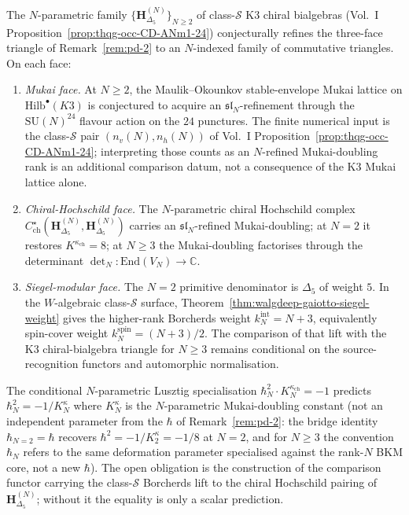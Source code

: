 \begin{remark}
\label{rem:pd-5-N-parametric}
The $N$-parametric family
$\{\mathbf H^{(N)}_{\Delta_5}\}_{N\ge 2}$ of class-$\mathcal S$
K3 chiral bialgebras
(Vol.~I Proposition~\ref{prop:thqg-occ-CD-ANm1-24}) conjecturally
refines the three-face triangle of Remark~\ref{rem:pd-2} to an
$N$-indexed family of commutative triangles. On each face:
\begin{enumerate}
\item \emph{Mukai face.} At $N\ge 2$, the Maulik--Okounkov
 stable-envelope Mukai lattice on $\mathrm{Hilb}^\bullet(K3)$
 is conjectured to acquire an $\mathfrak{sl}_N$-refinement through the
 $\mathrm{SU}(N)^{24}$ flavour action on the $24$ punctures. The
 finite numerical input is the class-$\mathcal S$ pair
 $(n_v(N),n_h(N))$ of
 Vol.~I Proposition~\ref{prop:thqg-occ-CD-ANm1-24}; interpreting
 those counts as an $N$-refined Mukai-doubling rank is an additional
 comparison datum, not a consequence of the K3 Mukai lattice alone.
\item \emph{Chiral-Hochschild face.} The $N$-parametric chiral Hochschild
 complex $C^\star_{\mathrm{ch}}(\mathbf H^{(N)}_{\Delta_5},
 \mathbf H^{(N)}_{\Delta_5})$ carries an
 $\mathfrak{sl}_N$-refined Mukai-doubling; at $N = 2$ it restores
 $K^{\kappa_{\mathrm{ch}}} = 8$; at $N \ge 3$ the Mukai-doubling
 factorises through the determinant
 $\det_N\colon\mathrm{End}(V_N)\to\mathbb C$.
\item \emph{Siegel-modular face.} The $N=2$ primitive denominator is
 $\Delta_5$ of weight $5$. In the $W$-algebraic class-$\mathcal S$
 surface, Theorem~\ref{thm:walgdeep-gaiotto-siegel-weight} gives
 the higher-rank Borcherds weight
 $k_N^{\mathrm{int}}=N+3$, equivalently spin-cover weight
 $k_N^{\mathrm{spin}}=(N+3)/2$. The comparison of that lift with
 the K3 chiral-bialgebra triangle for $N\ge3$ remains conditional
 on the source-recognition functors and automorphic normalisation.
\end{enumerate}
The conditional $N$-parametric Lusztig specialisation
$\hbar_N^2\cdot K^{\kappa_{\mathrm{ch}}}_N = -1$ predicts
$\hbar_N^2 = -1/K^{\kappa}_N$ where
$K^{\kappa}_N$ is the $N$-parametric Mukai-doubling constant
(not an independent parameter from the $\hbar$ of
Remark~\ref{rem:pd-2}: the bridge identity
$\hbar_{N=2} = \hbar$ recovers $\hbar^2 = -1/K^{\kappa}_2 =
-1/8$ at $N = 2$, and for $N\ge 3$ the convention
$\hbar_N$ refers to the same deformation parameter specialised
against the rank-$N$ BKM core, not a new $\hbar$). The open
obligation is the construction of the comparison functor carrying
the class-$\mathcal S$ Borcherds lift to the chiral Hochschild
pairing of $\mathbf H^{(N)}_{\Delta_5}$; without it the equality is
only a scalar prediction.
\end{remark}
